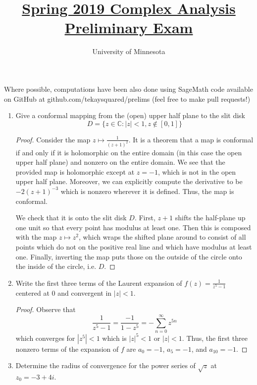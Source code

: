 \documentclass{article}
\title{\href{https://math.umn.edu/sites/math.umn.edu/files/exams/complexs19.pdf}{Spring 2019 Complex Analysis Preliminary Exam}}
\author{University of Minnesota}
\date{}
\begin{document}
\maketitle

Where possible, computations have been also done using SageMath code available on GitHub at github.com/tekaysquared/prelims (feel free to make pull requests!)

\begin{enumerate}
	\item Give a conformal mapping from the (open) upper half plane to the slit disk \[ D = \{ z \in \mathbb{C} : |z| < 1, z \not \in [0,1] \}\]
	
	\begin{proof}
		Consider the map $z \mapsto \frac{1}{(z+1)^2}$.
		It is a theorem that a map is conformal if and only if it is holomorphic on the entire domain (in this case the open upper half plane) and nonzero on the entire domain.
		We see that the provided map is holomorphic except at $z=-1$, which is not in the open upper half plane. 
		Moreover, we can explicitly compute the derivative to be $-2(z+1)^{-3}$ which is nonzero wherever it is defined. 
		Thus, the map is conformal.
		
		We check that it is onto the slit disk $D$. First, $z+1$ shifts the half-plane up one unit so that every point has modulus at least one. 
		Then this is composed with the map $z \mapsto z^2$, which wraps the shifted plane around to consist of all points which do not on the positive real line and which have modulus at least one. 
		Finally, inverting the map puts those on the outside of the circle onto the inside of the circle, i.e. $D$.
	\end{proof}
	\setcounter{enumi}{1}
	
	\item Write the first three terms of the Laurent expansion of $\displaystyle f(z) = \frac{1}{z^5-1}$ centered at $0$ and convergent in $|z|<1$.
	
	\begin{proof}
		Observe that \[\frac{1}{z^5-1} = \frac{-1}{1-z^5} = -\sum_{n=0}^\infty z^{5n}\]
		which converges for $|z^5|<1$ which is $|z|^5<1$ or $|z|<1$. 
		Thus, the first three nonzero terms of the expansion of $f$ are 
		$a_0 = -1$, $a_5=-1$, and $a_{10} = -1$.
	\end{proof}
	
	\setcounter{enumi}{4}
	
	\item Determine the radius of convergence for the power series of $\sqrt{z}$ at $z_0 = -3 + 4i$.
	

\end{enumerate}
\end{document}
